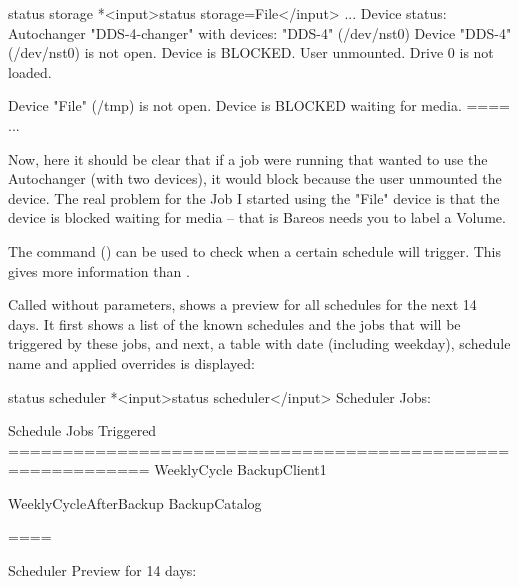 \begin{description}
\begin{bconsole}{status storage}
*<input>status storage=File</input>
...
Device status:
Autochanger "DDS-4-changer" with devices:
   "DDS-4" (/dev/nst0)
Device "DDS-4" (/dev/nst0) is not open.
    Device is BLOCKED. User unmounted.
    Drive 0 is not loaded.

Device "File" (/tmp) is not open.
    Device is BLOCKED waiting for media.
====
...
\end{bconsole}

Now, here it should be clear that if a job were running that wanted
to use the Autochanger (with two devices), it would block because
the user unmounted the device. The real problem for the Job I started
using the "File" device is that the device is blocked waiting for
media -- that is Bareos needs you to label a Volume.



The command  () can be used to check when a certain schedule will trigger.
This gives more information than .

Called without parameters,  shows a preview for all schedules for the next 14 days.
It first shows a list of the known schedules and the jobs that will be triggered by these jobs, and next, a table with date (including weekday), schedule name and applied overrides is displayed:

\begin{bconsole}{status scheduler}
*<input>status scheduler</input>
Scheduler Jobs:

Schedule               Jobs Triggered
===========================================================
WeeklyCycle
                       BackupClient1

WeeklyCycleAfterBackup
                       BackupCatalog

====

Scheduler Preview for 14 days:


\end{bconsole}
\end{description}
